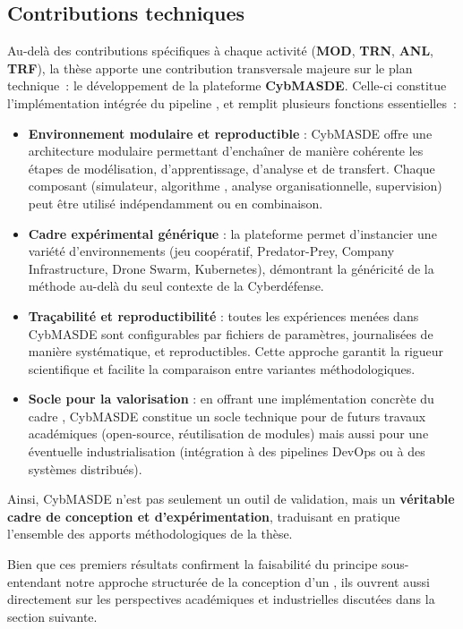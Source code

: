 \subsection*{Contributions techniques}

Au-delà des contributions spécifiques à chaque activité (\textbf{MOD}, \textbf{TRN}, \textbf{ANL}, \textbf{TRF}), la thèse apporte une contribution transversale majeure sur le plan technique~: le développement de la plateforme \textbf{CybMASDE}.
Celle-ci constitue l'implémentation intégrée du pipeline , et remplit plusieurs fonctions essentielles~:

\begin{itemize}
  \item \textbf{Environnement modulaire et reproductible} : CybMASDE offre une architecture modulaire permettant d'enchaîner de manière cohérente les étapes de modélisation, d'apprentissage, d'analyse et de transfert. Chaque composant (simulateur, algorithme , analyse organisationnelle, supervision) peut être utilisé indépendamment ou en combinaison.
  \item \textbf{Cadre expérimental générique} : la plateforme permet d'instancier une variété d'environnements (jeu coopératif, Predator-Prey, Company Infrastructure, Drone Swarm, Kubernetes), démontrant la généricité de la méthode au-delà du seul contexte de la Cyberdéfense.
  \item \textbf{Traçabilité et reproductibilité} : toutes les expériences menées dans CybMASDE sont configurables par fichiers de paramètres, journalisées de manière systématique, et reproductibles. Cette approche garantit la rigueur scientifique et facilite la comparaison entre variantes méthodologiques.
  \item \textbf{Socle pour la valorisation} : en offrant une implémentation concrète du cadre , CybMASDE constitue un socle technique pour de futurs travaux académiques (open-source, réutilisation de modules) mais aussi pour une éventuelle industrialisation (intégration à des pipelines DevOps ou à des systèmes distribués).
\end{itemize}

Ainsi, CybMASDE n'est pas seulement un outil de validation, mais un \textbf{véritable cadre de conception et d'expérimentation}, traduisant en pratique l'ensemble des apports méthodologiques de la thèse.


\noindent
Bien que ces premiers résultats confirment la faisabilité du principe sous-entendant notre approche structurée de la conception d'un , ils ouvrent aussi directement sur les perspectives académiques et industrielles discutées dans la section suivante.

